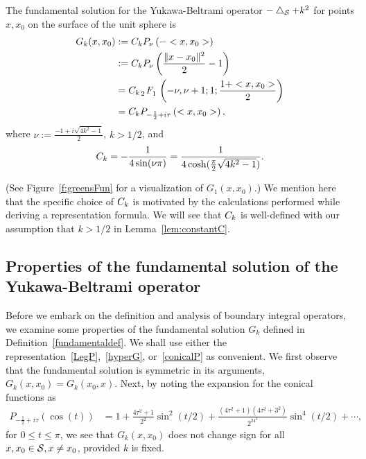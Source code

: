 \begin{definition}
\label{fundamentaldef} 
The fundamental solution for the Yukawa-Beltrami operator $-\lap_\S +
k^2$ for points $x,x_0$ on the surface of the unit sphere is 
\begin{subequations}
  \begin{align}
    G_k(x,x_{0})&:=\C P_{\nu}\left(-<x,x_{0}>\right) \nonumber \\
    &:=\C P_{\nu}\left(\frac{\|x-x_{0}\|^2}{2}-1\right) \label{LegP} \\
    &= \C\, \tensor[_2]{F}{_1} \left(-\nu, \nu+1; 1; 
      \frac{1+<x,x_{0}>}{2}\right)\label{hyperG} \\
    &=\C P_{-\frac{1}{2} + i \tau}
    \left(<x,x_{0}>\right) \label{conicalP},
  \end{align} 
\end{subequations}
where 
$\nu:=\frac{-1+i\sqrt{4k^2-1}}{2}$, $k>1/2$, and 
\begin{align}
  \label{constant-definition}    
  \C=-\frac{1}{4\sin(\nu\pi)} 
    =\frac{1}{4\cosh(\frac{\pi}{2}\sqrt{4k^2-1})}.
\end{align}
\end{definition} 
(See Figure~\ref{f:greensFun} for a visualization of $G_1(x,x_0)$.) We
mention here that the specific choice of $\C$ is motivated by the
calculations performed while deriving a representation formula.  We will
see that $\C$ is well-defined with our assumption that $k>1/2$ in
Lemma~\ref{lem:constantC}.


\subsection{Properties of the fundamental solution of the
Yukawa-Beltrami operator}
Before we embark on the definition and analysis of boundary integral
operators, we examine some properties of the fundamental solution $G_k$
defined in Definition~\ref{fundamentaldef}. We shall use either the
representation~\eqref{LegP},~\eqref{hyperG}, or~\eqref{conicalP} as
convenient.  We first observe that the fundamental solution is symmetric
in its arguments, $G_k(x,x_{0}) = G_k(x_{0},x)$. Next, by noting the
expansion for the conical functions as~\cite{lebedev}
\begin{align*}
  P_{-\frac{1}{2}+i \tau} (\cos(t)) &= 1+
    \frac{4\tau^2+1}{2^2}\sin^2(t/2) + 
      \frac{(4\tau^2+1)(4\tau^2+3^2)}{2^24^2}\sin^4(t/2) + 
    \cdots,
\end{align*}
for $0\leq t\leq \pi$, we see that $G_k(x,x_0)$ does not change sign for
  all $x,x_{0} \in \S, x \neq x_{0}$, provided $k$ is fixed.

